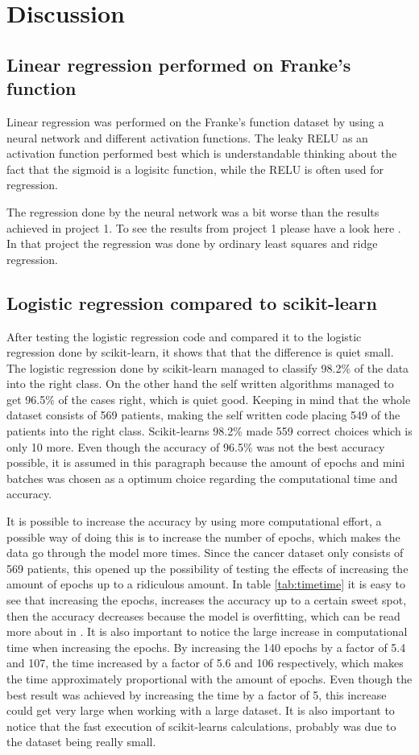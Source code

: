 \documentclass[../main.tex]{subfiles}
\begin{document}
\section{Discussion}
\subsection{Linear regression performed on Franke's function}
Linear regression was performed on the Franke's function dataset by using a neural network and different activation functions. The leaky RELU as an activation function performed best which is understandable thinking about the fact that the sigmoid is a logisitc function, while the RELU is often used for regression.

The regression done by the neural network was a bit worse than the results achieved in project 1. To see the results from project 1 please have a look here \cite{project1}. In that project the regression was done by ordinary least squares and ridge regression. 


\subsection{Logistic regression compared to scikit-learn}
After testing the logistic regression code and compared it to the logistic regression done by scikit-learn, it shows that that the difference is quiet small. The logistic regression done by scikit-learn managed to classify 98.2\% of the data into the right class. On the other hand the self written algorithms managed to get 96.5\% of the cases right, which is quiet good. Keeping in mind that the whole dataset consists of 569 patients, making the self written code placing 549 of the patients into the right class. Scikit-learns 98.2\% made 559 correct choices which is only 10 more. Even though the accuracy of 96.5\% was not the best accuracy possible, it is assumed in this paragraph because the amount of epochs and mini batches was chosen as a optimum choice regarding the computational time and accuracy. 

It is possible to increase the accuracy by using more computational effort, a possible way of doing this is to increase the number of epochs, which makes the data go through the model more times. Since the cancer dataset only consists of 569 patients, this opened up the possibility of testing the effects of increasing the amount of epochs up to a ridiculous amount. In table \ref{tab:timetime} it is easy to see that increasing the epochs, increases the accuracy up to a certain sweet spot, then the accuracy decreases because the model is overfitting, which can be read more about in \cite{project1}. It is also important to notice the large increase in computational time when increasing the epochs. By increasing the 140 epochs by a factor of 5.4 and 107, the time increased by a factor of 5.6 and 106 respectively, which makes the time approximately proportional with the amount of epochs. Even though the best result was achieved by increasing the time by a factor of 5, this increase could get very large when working with a large dataset. It is also important to notice that the fast execution of scikit-learns calculations, probably was due to the dataset being really small.
\end{document}
